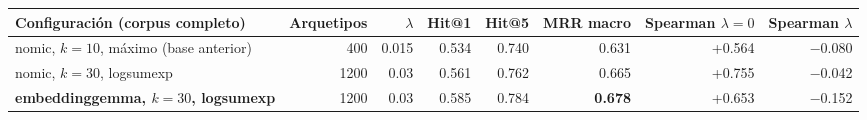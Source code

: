 \begin{tabular}{lrrrrrrr}
\toprule
Configuración (corpus completo) & Arquetipos & $\lambda$ & Hit@1 & Hit@5 & MRR macro & Spearman $\lambda=0$ & Spearman $\lambda$ \\
\midrule
nomic, $k=10$, máximo (base anterior) & 400 & 0.015 & 0.534 & 0.740 & 0.631 & +0.564 & $-$0.080 \\
nomic, $k=30$, logsumexp & 1200 & 0.03 & 0.561 & 0.762 & 0.665 & +0.755 & $-$0.042 \\
\textbf{embeddinggemma, $k=30$, logsumexp} & 1200 & 0.03 & 0.585 & 0.784 & \textbf{0.678} & +0.653 & $-$0.152 \\
\bottomrule
\end{tabular}
